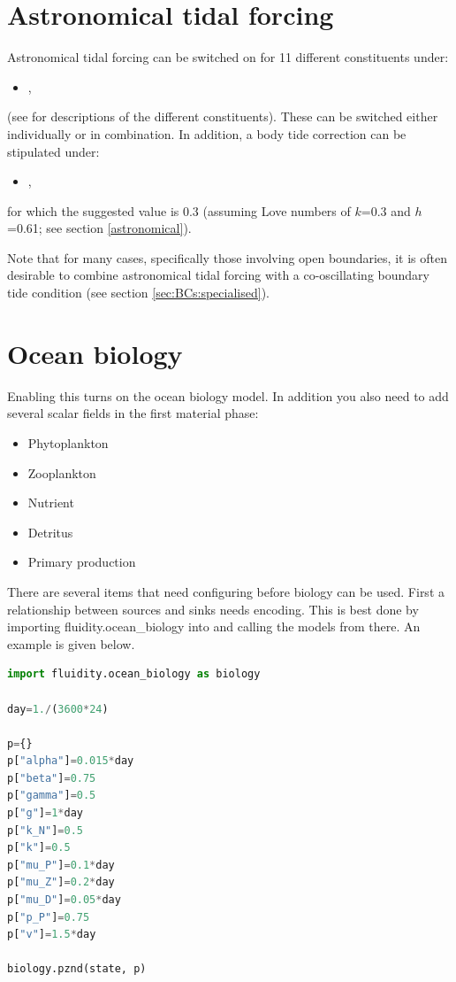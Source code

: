 \section{Astronomical tidal forcing}
\label{config:tides}

Astronomical tidal forcing can be switched on for 11 different constituents
under:
\begin{itemize}
\item {},
\end{itemize}
(see \citealp{Wells2008} for descriptions of
the different constituents). These can be switched either
individually or in combination. In addition, a body tide correction can be stipulated
under:
\begin{itemize}
\item {},
\end{itemize}
for which the suggested value is 0.3 (assuming
Love numbers of $k$=0.3 and $h$=0.61; see section \ref{astronomical}).

Note that for many cases, specifically those involving open boundaries, it is often
desirable to combine astronomical tidal forcing with a co-oscillating boundary tide condition
(see section \ref{sec:BCs:specialised}).

\section{Ocean biology}

Enabling this turns on the ocean biology model. In addition you also need to add several scalar fields in the first material phase:
\begin{itemize}
\item Phytoplankton
\item Zooplankton
\item Nutrient
\item Detritus
\item Primary production
\end{itemize}

There are several items that need configuring before biology can be used.
First a relationship between sources and sinks needs encoding. This is best
done by importing fluidity.ocean\_biology into
 and calling the
models from there. An example is given below.

\begin{example}
  \begin{lstlisting}[language=Python]
import fluidity.ocean_biology as biology

day=1./(3600*24)

p={}
p["alpha"]=0.015*day
p["beta"]=0.75
p["gamma"]=0.5
p["g"]=1*day
p["k_N"]=0.5
p["k"]=0.5
p["mu_P"]=0.1*day
p["mu_Z"]=0.2*day
p["mu_D"]=0.05*day
p["p_P"]=0.75
p["v"]=1.5*day

biology.pznd(state, p)
  \end{lstlisting}
  \caption{A Python function that imports the biology module and sets the algorithm to use.}
\end{example}

